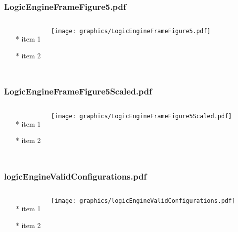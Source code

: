 \documentclass{beamer}
\begin{document}
\begin{frame} \frametitle{LogicEngineFrameFigure5.pdf}
    \begin{columns}[c]
        \begin{itemize}
            \item[*] item 1
            \item[*] item 2
        \end{itemize}
        \begin{minipage}{\linewidth}
            \begin{center}
            \texttt{[image: graphics/LogicEngineFrameFigure5.pdf]}
            \label{gfx:LogicEngineFrameFigure5.pdf}
            \end{center}
        \end{minipage}
    \end{columns}
\end{frame}
\begin{frame} \frametitle{LogicEngineFrameFigure5Scaled.pdf}
    \begin{columns}[c]
        \begin{itemize}
            \item[*] item 1
            \item[*] item 2
        \end{itemize}
        \begin{minipage}{\linewidth}
            \begin{center}
            \texttt{[image: graphics/LogicEngineFrameFigure5Scaled.pdf]}
            \label{gfx:LogicEngineFrameFigure5Scaled.pdf}
            \end{center}
        \end{minipage}
    \end{columns}
\end{frame}
\begin{frame} \frametitle{logicEngineValidConfigurations.pdf}
    \begin{columns}[c]
        \begin{itemize}
            \item[*] item 1
            \item[*] item 2
        \end{itemize}
        \begin{minipage}{\linewidth}
            \begin{center}
            \texttt{[image: graphics/logicEngineValidConfigurations.pdf]}
            \label{gfx:logicEngineValidConfigurations.pdf}
            \end{center}
        \end{minipage}
    \end{columns}
\end{frame}
\end{document}
